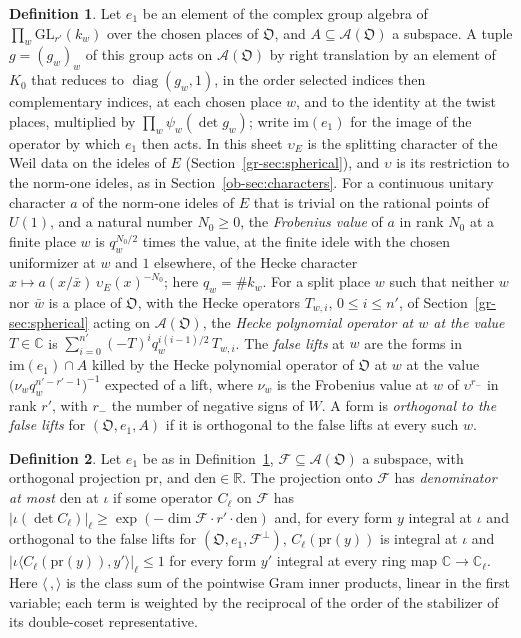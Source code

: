 \documentclass[reqno]{amsart}
\theoremstyle{definition}
\newtheorem{definition}{Definition}[section]
\theoremstyle{plain}
\newcommand{\C}{\mathbb{C}}
\newcommand{\pr}{\mathrm{pr}}
\newcommand{\GL}{\mathrm{GL}}
\newcommand{\DP}{\mathfrak{O}}
\begin{document}
\begin{definition}\label{def:false-lift}
Let \(e_1\) be an element of the complex group algebra of \(\prod_w \GL_{r'}(k_w)\) over the chosen places of \(\DP\), and \(A \subseteq \mathcal A(\DP)\) a subspace.  A tuple \(g = (g_w)_w\) of this group acts on \(\mathcal A(\DP)\) by right translation by an element of \(K_0\) that reduces to \(\operatorname{diag}(g_w,1)\), in the order selected indices then complementary indices, at each chosen place \(w\), and to the identity at the twist places, multiplied by \(\prod_w \psi_w(\det g_w)\); write \(\mathrm{im}(e_1)\) for the image of the operator by which \(e_1\) then acts.  In this sheet \(\upsilon_E\) is the splitting character of the Weil data on the ideles of \(E\) (Section~\ref{gr-sec:spherical}), and \(\upsilon\) is its restriction to the norm-one ideles, as in Section~\ref{ob-sec:characters}.  For a continuous unitary character \(a\) of the norm-one ideles of \(E\) that is trivial on the rational points of \(U(1)\), and a natural number \(N_0\ge 0\), the \emph{Frobenius value} of \(a\) in rank \(N_0\) at a finite place \(w\) is \(q_w^{N_0/2}\) times the value, at the finite idele with the chosen uniformizer at \(w\) and \(1\) elsewhere, of the Hecke character \(x \mapsto a(x/\bar x)\,\upsilon_E(x)^{-N_0}\); here \(q_w = \#k_w\).  For a split place \(w\) such that neither \(w\) nor \(\bar w\) is a place of \(\DP\), with the Hecke operators \(T_{w,i}\), \(0 \le i \le n'\), of Section~\ref{gr-sec:spherical} acting on \(\mathcal A(\DP)\), the \emph{Hecke polynomial operator at \(w\) at the value \(T \in \C\)} is \(\sum_{i=0}^{n'} (-T)^i q_w^{i(i-1)/2}\, T_{w,i}\).  The \emph{false lifts} at \(w\) are the forms in \(\mathrm{im}(e_1) \cap A\) killed by the Hecke polynomial operator of \(\DP\) at \(w\) at the value \(\bigl(\nu_w q_w^{n'-r'-1}\bigr)^{-1}\) expected of a lift, where \(\nu_w\) is the Frobenius value at \(w\) of \(\upsilon^{r_-}\) in rank \(r'\), with \(r_-\) the number of negative signs of \(W\).  A form is \emph{orthogonal to the false lifts} for \((\DP, e_1, A)\) if it is orthogonal to the false lifts at every such \(w\).
\end{definition}

\begin{definition}\label{def:denominator}
Let \(e_1\) be as in Definition~\ref{def:false-lift}, \(\mathcal F \subseteq \mathcal A(\DP)\) a subspace, with orthogonal projection \(\pr\), and \(\mathrm{den} \in \mathbb R\).  The projection onto \(\mathcal F\) has \emph{denominator at most \(\mathrm{den}\)} at \(\iota\) if some operator \(C_\ell\) on \(\mathcal F\) has \(\lvert \iota(\det C_\ell) \rvert_\ell \ge \exp(-\dim \mathcal F \cdot r' \cdot \mathrm{den})\) and, for every form \(y\) integral at \(\iota\) and orthogonal to the false lifts for \((\DP, e_1, \mathcal F^\perp)\), \(C_\ell(\pr(y))\) is integral at \(\iota\) and \(\lvert \iota\langle C_\ell(\pr(y)), y' \rangle \rvert_\ell \le 1\) for every form \(y'\) integral at every ring map \(\C \to \C_\ell\).  Here \(\langle\,,\rangle\) is the class sum of the pointwise Gram inner products, linear in the first variable; each term is weighted by the reciprocal of the order of the stabilizer of its double-coset representative.
\end{definition}
\end{document}
